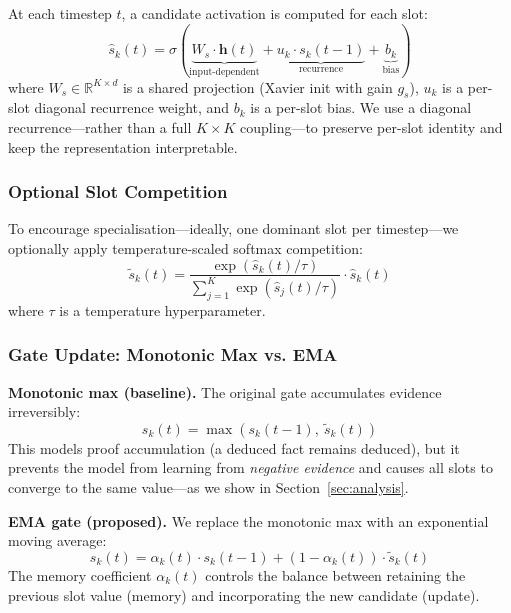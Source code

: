 \documentclass[conference]{IEEEtran}
\newcommand{\Real}{\mathbb{R}}
\begin{document}
At each timestep $t$, a candidate activation is computed for each
slot:
\begin{equation}
    \hat{s}_k(t) = \sigma\!\left(
    \underbrace{W_s \cdot \mathbf{h}(t)}_{\text{input-dependent}}
    + \underbrace{u_k \cdot s_k(t{-}1)}_{\text{recurrence}}
    + \underbrace{b_k}_{\text{bias}}
    \right)
\label{eq:candidate}
\end{equation}
where $W_s \in \Real^{K \times d}$ is a shared projection
(Xavier init with gain $g_s$), $u_k$ is a per-slot diagonal
recurrence weight, and $b_k$ is a per-slot bias. We use a
diagonal recurrence---rather than a full $K \times K$
coupling---to preserve per-slot identity and keep the
representation interpretable.

\subsubsection{Optional Slot Competition}

To encourage specialisation---ideally, one dominant slot per
timestep---we optionally apply temperature-scaled softmax
competition:
\begin{equation}
    \tilde{s}_k(t) = \frac{\exp(\hat{s}_k(t) / \tau)}
    {\sum_{j=1}^K \exp(\hat{s}_j(t) / \tau)} \cdot \hat{s}_k(t)
\label{eq:competition}
\end{equation}
where $\tau$ is a temperature hyperparameter.

\subsubsection{Gate Update: Monotonic Max vs. EMA}

\textbf{Monotonic max (baseline).}
The original gate accumulates evidence irreversibly:
\begin{equation}
    s_k(t) = \max\!\left(s_k(t{-}1),\ \tilde{s}_k(t)\right)
\label{eq:monotonic}
\end{equation}
This models proof accumulation (a deduced fact remains
deduced), but it prevents the model from learning from
\emph{negative evidence} and causes all slots to converge
to the same value---as we show in Section~\ref{sec:analysis}.

\textbf{EMA gate (proposed).}
We replace the monotonic max with an exponential moving average:
\begin{equation}
    s_k(t) = \alpha_k(t) \cdot s_k(t{-}1) +
    (1 - \alpha_k(t)) \cdot \tilde{s}_k(t)
\label{eq:ema}
\end{equation}
The memory coefficient $\alpha_k(t)$ controls the balance
between retaining the previous slot value (memory) and
incorporating the new candidate (update).
\end{document}

